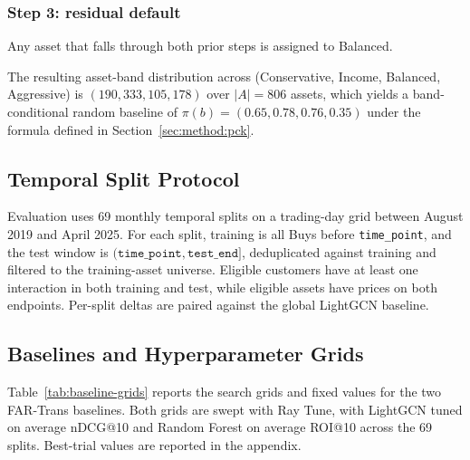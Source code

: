 \subsubsection{Step 3: residual default} Any asset that falls through both prior steps is assigned to Balanced.

The resulting asset-band distribution across (Conservative, Income, Balanced, Aggressive) is $(190, 333, 105, 178)$ over $|A| = 806$ assets, which yields a band-conditional random baseline of $\pi(b) = (0.65, 0.78, 0.76, 0.35)$ under the formula defined in Section~\ref{sec:method:pck}.

\subsection{Temporal Split Protocol}
\label{sec:setup:splits}

Evaluation uses 69 monthly temporal splits on a trading-day grid between August 2019 and April 2025. For each split, training is all Buys before \texttt{time\_point}, and the test window is $(\texttt{time\_point}, \texttt{test\_end}]$, deduplicated against training and filtered to the training-asset universe. Eligible customers have at least one interaction in both training and test, while eligible assets have prices on both endpoints. Per-split deltas are paired against the global LightGCN baseline.

\subsection{Baselines and Hyperparameter Grids}
\label{sec:setup:baselines}

Table~\ref{tab:baseline-grids} reports the search grids and fixed values for the two FAR-Trans baselines. Both grids are swept with Ray Tune, with LightGCN tuned on average nDCG@10 and Random Forest on average ROI@10 across the 69 splits. Best-trial values are reported in the appendix.

